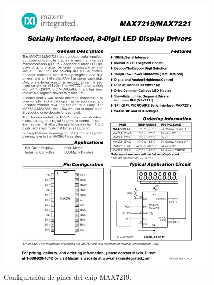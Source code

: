         \begin{figure}[ht!]
            \centering
            \begin{center}
            \includegraphics[scale=1.2]{imagenes/hw-conexiones/max.pdf}
             \caption{Configuración de pines del chip MAX7219.}
              \label{fig:MAX-pines}
            \end{center}
        \end{figure}
        
